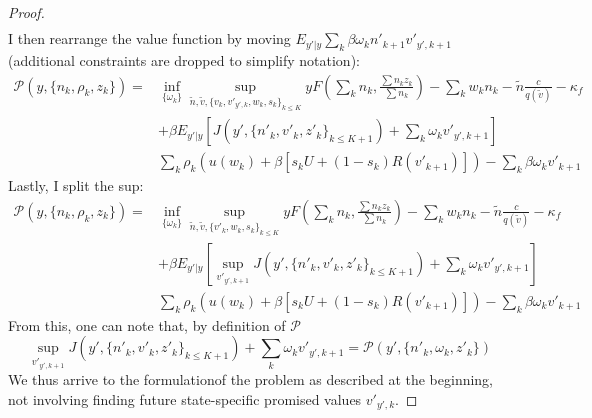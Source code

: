 \begin{proof}
\begin{equation*}
\begin{split}
    \end{split}
\end{equation*}
I then rearrange the value function by moving $E_{y'|y}\sum_k \beta\omega_kn'_{k+1}v'_{y',k+1}$ (additional constraints are dropped to simplify notation):
\begin{equation*}
    \begin{split}
 \mathcal{P}(y,\{n_k,\rho_k,z_k\}) =
    & \inf_{\{\omega_k\}}\sup_{\tilde{n},\tilde{v},\{v_k,v'_{y',k},w_{k},s_{k}\}_{k\leq K}} 
    yF(\sum_k n_k,\frac{\sum n_kz_k}{\sum n_k})-
    \sum_k w_kn_k
    -\tilde{n}\frac{c}{q(\tilde{v})}-\kappa_f \\
    & +\beta E_{y'|y} [J(y',\{n'_k,v'_k,z'_k\}_{k\leq K+1}) + \sum_k\omega_kv'_{y',k+1}]\\
    & \sum_k \rho_k (u(w_k) + \beta [s_k U + (1-s_k)R(v'_{k+1})])- \sum_k \beta\omega_kv'_{k+1}  
    \end{split}
\end{equation*}
Lastly, I split the sup:
\begin{equation*}
    \begin{split}
    \mathcal{P}(y,\{n_k,\rho_k,z_k\}) =
    & \inf_{\{\omega_k\}}\sup_{\tilde{n},\tilde{v},\{v'_k,w_{k},s_{k}\}_{k\leq K}} 
    yF(\sum_k n_k,\frac{\sum n_kz_k}{\sum n_k})-
    \sum_k w_kn_k
    -\tilde{n}\frac{c}{q(\tilde{v})}-\kappa_f \\
    & +\beta E_{y'|y} [\sup_{v'_{y',k+1}}J(y',\{n'_k,v'_k,z'_k\}_{k\leq K+1}) + \sum_k\omega_kv'_{y',k+1}]\\
    & \sum_k \rho_k (u(w_k) + \beta [s_k U + (1-s_k)R(v'_{k+1})])- \sum_k \beta\omega_kv'_{k+1}     
    \end{split}
\end{equation*}
From this, one can note that, by definition of $\mathcal{P}$ \[\sup_{v'_{y',k+1}}J(y',\{n'_k,v'_k,z'_k\}_{k\leq K+1}) + \sum_k\omega_kv'_{y',k+1} = \mathcal{P}(y',\{n'_k,\omega_k,z'_k\})\]
We thus arrive to the formulationof the problem as described at the beginning, not involving finding future state-specific promised values $v'_{y',k}$.
\end{proof}
